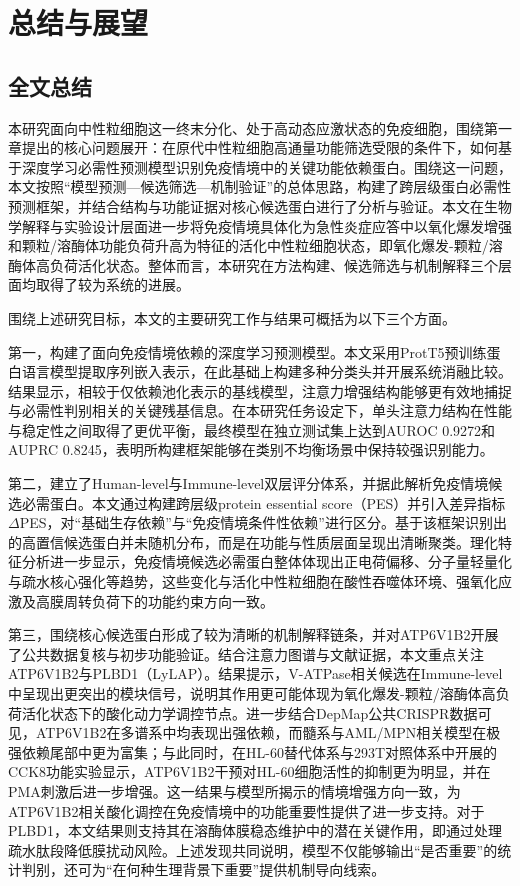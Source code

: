 \chapter{总结与展望}

\section{全文总结}

本研究面向中性粒细胞这一终末分化、处于高动态应激状态的免疫细胞，围绕第一章提出的核心问题展开：在原代中性粒细胞高通量功能筛选受限的条件下，如何基于深度学习必需性预测模型识别免疫情境中的关键功能依赖蛋白。围绕这一问题，本文按照“模型预测—候选筛选—机制验证”的总体思路，构建了跨层级蛋白必需性预测框架，并结合结构与功能证据对核心候选蛋白进行了分析与验证。本文在生物学解释与实验设计层面进一步将免疫情境具体化为急性炎症应答中以氧化爆发增强和颗粒/溶酶体功能负荷升高为特征的活化中性粒细胞状态，即氧化爆发-颗粒/溶酶体高负荷活化状态。整体而言，本研究在方法构建、候选筛选与机制解释三个层面均取得了较为系统的进展。

围绕上述研究目标，本文的主要研究工作与结果可概括为以下三个方面。

第一，构建了面向免疫情境依赖的深度学习预测模型。本文采用ProtT5预训练蛋白语言模型提取序列嵌入表示，在此基础上构建多种分类头并开展系统消融比较。结果显示，相较于仅依赖池化表示的基线模型，注意力增强结构能够更有效地捕捉与必需性判别相关的关键残基信息。在本研究任务设定下，单头注意力结构在性能与稳定性之间取得了更优平衡，最终模型在独立测试集上达到AUROC 0.9272和AUPRC 0.8245，表明所构建框架能够在类别不均衡场景中保持较强识别能力。

第二，建立了Human-level与Immune-level双层评分体系，并据此解析免疫情境候选必需蛋白。本文通过构建跨层级protein essential score（PES）并引入差异指标 $\Delta$PES，对“基础生存依赖”与“免疫情境条件性依赖”进行区分。基于该框架识别出的高置信候选蛋白并未随机分布，而是在功能与性质层面呈现出清晰聚类。理化特征分析进一步显示，免疫情境候选必需蛋白整体体现出正电荷偏移、分子量轻量化与疏水核心强化等趋势，这些变化与活化中性粒细胞在酸性吞噬体环境、强氧化应激及高膜周转负荷下的功能约束方向一致。

第三，围绕核心候选蛋白形成了较为清晰的机制解释链条，并对ATP6V1B2开展了公共数据复核与初步功能验证。结合注意力图谱与文献证据，本文重点关注ATP6V1B2与PLBD1（LyLAP）。结果提示，V-ATPase相关候选在Immune-level中呈现出更突出的模块信号，说明其作用更可能体现为氧化爆发-颗粒/溶酶体高负荷活化状态下的酸化动力学调控节点。进一步结合DepMap公共CRISPR数据可见，ATP6V1B2在多谱系中均表现出强依赖，而髓系与AML/MPN相关模型在极强依赖尾部中更为富集；与此同时，在HL-60替代体系与293T对照体系中开展的CCK8功能实验显示，ATP6V1B2干预对HL-60细胞活性的抑制更为明显，并在PMA刺激后进一步增强。这一结果与模型所揭示的情境增强方向一致，为ATP6V1B2相关酸化调控在免疫情境中的功能重要性提供了进一步支持。对于PLBD1，本文结果则支持其在溶酶体膜稳态维护中的潜在关键作用，即通过处理疏水肽段降低膜扰动风险。上述发现共同说明，模型不仅能够输出“是否重要”的统计判别，还可为“在何种生理背景下重要”提供机制导向线索。

